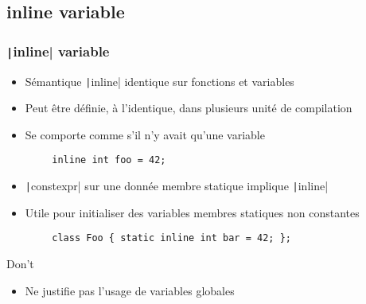 \documentclass[C++.tex]{subfiles}
\begin{document}
\subsection*{inline variable}
\begin{frame}[fragile]
	\frametitle{\texttt|inline| variable}
	\begin{itemize}
		\item Sémantique \texttt|inline| identique sur fonctions et variables
		\item Peut être définie, à l'identique, dans plusieurs unité de compilation
		\item Se comporte comme s'il n'y avait qu'une variable
	\end{itemize}

	\begin{verbatim}
		inline int foo = 42;
	\end{verbatim}

	\begin{itemize}
		\item \texttt|constexpr| sur une donnée membre statique implique \texttt|inline|
		\item Utile pour initialiser des variables membres statiques non constantes
	\end{itemize}

	\begin{verbatim}
		class Foo { static inline int bar = 42; };
	\end{verbatim}

	\begin{alertblock}{Don't}
		\begin{itemize}
			\item Ne justifie pas l'usage de variables globales
		\end{itemize}
	\end{alertblock}

\end{frame}
\end{document}
